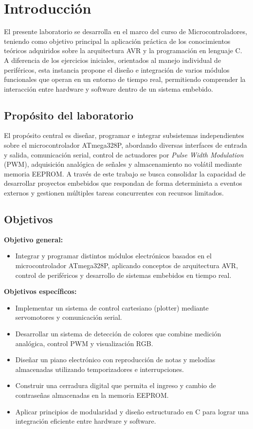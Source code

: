 \section{Introducción}

El presente laboratorio se desarrolla en el marco del curso de Microcontroladores, teniendo como objetivo principal la aplicación práctica de los conocimientos teóricos adquiridos sobre la arquitectura AVR y la programación en lenguaje C. A diferencia de los ejercicios iniciales, orientados al manejo individual de periféricos, esta instancia propone el diseño e integración de varios módulos funcionales que operan en un entorno de tiempo real, permitiendo comprender la interacción entre hardware y software dentro de un sistema embebido.  

\subsection{Propósito del laboratorio}

El propósito central es diseñar, programar e integrar subsistemas independientes sobre el microcontrolador ATmega328P, abordando diversas interfaces de entrada y salida, comunicación serial, control de actuadores por \textit{Pulse Width Modulation} (PWM), adquisición analógica de señales y almacenamiento no volátil mediante memoria EEPROM.  
A través de este trabajo se busca consolidar la capacidad de desarrollar proyectos embebidos que respondan de forma determinista a eventos externos y gestionen múltiples tareas concurrentes con recursos limitados.

\subsection{Objetivos}

\textbf{Objetivo general:}
\begin{itemize}
    \item Integrar y programar distintos módulos electrónicos basados en el microcontrolador ATmega328P, aplicando conceptos de arquitectura AVR, control de periféricos y desarrollo de sistemas embebidos en tiempo real.
\end{itemize}

\textbf{Objetivos específicos:}
\begin{itemize}
    \item Implementar un sistema de control cartesiano (plotter) mediante servomotores y comunicación serial.
    \item Desarrollar un sistema de detección de colores que combine medición analógica, control PWM y visualización RGB.
    \item Diseñar un piano electrónico con reproducción de notas y melodías almacenadas utilizando temporizadores e interrupciones.
    \item Construir una cerradura digital que permita el ingreso y cambio de contraseñas almacenadas en la memoria EEPROM.
    \item Aplicar principios de modularidad y diseño estructurado en C para lograr una integración eficiente entre hardware y software.
\end{itemize}

